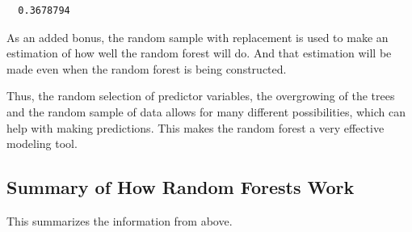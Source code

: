 \documentclass[12pt,twoside]{reedthesis}
\begin{document}
  \begin{verbatim}
  0.3678794
  \end{verbatim}
  
  As an added bonus, the random sample with replacement is used to make an
  estimation of how well the random forest will do. And that estimation
  will be made even when the random forest is being constructed.
  
  Thus, the random selection of predictor variables, the overgrowing of
  the trees and the random sample of data allows for many different
  possibilities, which can help with making predictions. This makes the
  random forest a very effective modeling tool.
  
  \subsection{Summary of How Random Forests
  Work}\label{summary-of-how-random-forests-work}
  
  This summarizes the information from above.
  
\end{document}
